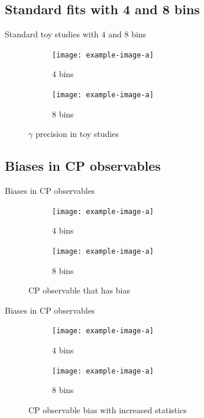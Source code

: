 \documentclass{beamer}
\begin{document}
\subsection{Standard fits with 4 and 8 bins}
\begin{frame}{Standard toy studies with $4$ and $8$ bins}
  \begin{figure}
    \centering
    \vspace{-0.2cm}
    \begin{subfigure}{0.5\textwidth}
      \texttt{[image: example-image-a]}
      \caption{$4$ bins}
    \end{subfigure}%
    \begin{subfigure}{0.5\textwidth}
      \texttt{[image: example-image-a]}
      \caption{$8$ bins}
    \end{subfigure}
    \caption{$\gamma$ precision in toy studies}
  \end{figure}
\end{frame}

\subsection{Biases in CP observables}
\begin{frame}{Biases in CP observables}
  \begin{figure}
    \centering
    \vspace{-0.2cm}
    \begin{subfigure}{0.5\textwidth}
      \texttt{[image: example-image-a]}
      \caption{$4$ bins}
    \end{subfigure}%
    \begin{subfigure}{0.5\textwidth}
      \texttt{[image: example-image-a]}
      \caption{$8$ bins}
    \end{subfigure}
    \caption{CP observable that has bias}
  \end{figure}
\end{frame}

\begin{frame}{Biases in CP observables}
  \begin{figure}
    \centering
    \vspace{-0.2cm}
    \begin{subfigure}{0.5\textwidth}
      \texttt{[image: example-image-a]}
      \caption{$4$ bins}
    \end{subfigure}%
    \begin{subfigure}{0.5\textwidth}
      \texttt{[image: example-image-a]}
      \caption{$8$ bins}
    \end{subfigure}
    \caption{CP observable bias with increased statistics}
  \end{figure}
\end{frame}
\end{document}

